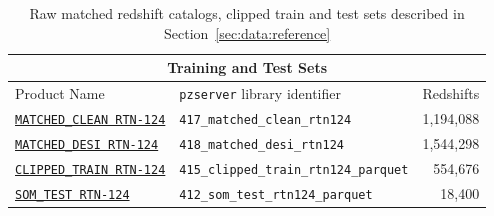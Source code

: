 \begin{table}
\centering
\begin{tabular}{llr}
 \hline
 \multicolumn{3}{c}{Training and Test Sets} \\ \hline
Product Name & \texttt{pzserver} library identifier & Redshifts \\
 \hline
 \hline
\href{https://pzserver.linea.org.br/product/417_matched_clean_rtn124}{\texttt{MATCHED\_CLEAN RTN-124}} & \texttt{417\_matched\_clean\_rtn124} & 1,194,088 \\ 
\href{https://pzserver.linea.org.br/product/418_matched_desi_rtn124}{\texttt{MATCHED\_DESI RTN-124}} & \texttt{418\_matched\_desi\_rtn124} & 1,544,298 \\
\href{https://pzserver.linea.org.br/product/415_clipped_train_rtn124_parquet}{\texttt{CLIPPED\_TRAIN RTN-124}} & \texttt{415\_clipped\_train\_rtn124\_parquet} &  554,676 \\
\href{https://pzserver.linea.org.br/product/412_som_test_rtn124_parquet}{\texttt{SOM\_TEST RTN-124}} & \texttt{412\_som\_test\_rtn124\_parquet} & 18,400 \\  
\hline
\end{tabular}
\caption{Raw matched redshift catalogs, clipped train and test sets described in Section~\ref{sec:data:reference}} 
\label{tab:pzserver-training-and-test-sets}
\end{table}


